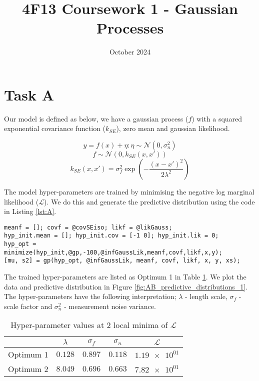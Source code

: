 \documentclass[11pt]{article}
\title{\vspace{-2cm}4F13 Coursework 1 - Gaussian Processes}
\author{}
\date{October 2024}
\newcommand{\Lik}{\mathcal{L}}
\begin{document}
\maketitle
\section{Task A}

Our model is defined as below, we have a gaussian process ($f$) with a squared exponential covariance function ($k_{SE}$), zero mean and gaussian likelihood. 

\[y = f(x) + \eta : \eta \sim \mathcal{N}(0, \sigma_n^2)\]
\[f \sim \mathcal{N}(0, k_{SE}(x, x'))\]
\[k_{SE}(x,x') = \sigma_f^2 \exp(-\frac{(x-x')^2}{2\lambda^2})\]

The model hyper-parameters are trained by minimising the negative log marginal likelihood ($\Lik$). We do this and generate the predictive distribution using the code in Listing \ref{lst:A}. 

\begin{lstlisting}[caption=Code to train hyper-parameters and generate the predictive distribution of a GP with squared exponential covariance, captionpos=b, basicstyle=\small, frame=tlrb]
meanf = []; covf = @covSEiso; likf = @likGauss; 
hyp_init.mean = []; hyp_init.cov = [-1 0]; hyp_init.lik = 0;
hyp_opt = minimize(hyp_init,@gp,-100,@infGaussLik,meanf,covf,likf,x,y);
[mu, s2] = gp(hyp_opt, @infGaussLik, meanf, covf, likf, x, y, xs);
\end{lstlisting}
\label{lst:A}

The trained hyper-parameters are listed as Optimum 1 in Table \ref{table:AB_hyper_parameters}. We plot the data and predictive distribution in Figure \ref{fig:AB_predictive_distributions_1}. The hyper-parameters have the following interpretation; $\lambda$ - length scale, $\sigma_f$ - scale factor and $\sigma_n^2$ - measurement noise variance.

\begin{table}[h]
    \centering
    \small
    \begin{tabular}{|c|c|c|c|c|}
        \hline
         & $\lambda$ & $\sigma_f$ & $\sigma_n$ & $\Lik$ \\
        \hline
        Optimum 1 & $0.128$ & $0.897$ & $0.118$ & $\num{1.19e+01}$ \\ 
        Optimum 2 & $8.049$ & $0.696$ & $0.663$ & $\num{7.82e+01}$ \\ 
        \hline
    \end{tabular}
    \caption{Hyper-parameter values at 2 local minima of $\Lik$}
    \label{table:AB_hyper_parameters}
\end{table}
\end{document}
